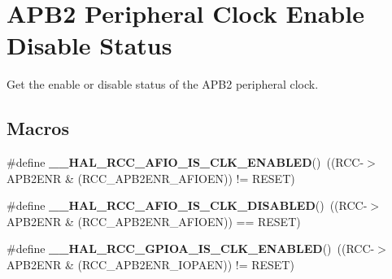 \hypertarget{group___r_c_c___a_p_b2___peripheral___clock___enable___disable___status}{}\section{A\+P\+B2 Peripheral Clock Enable Disable Status}
\label{group___r_c_c___a_p_b2___peripheral___clock___enable___disable___status}


Get the enable or disable status of the A\+P\+B2 peripheral clock.  


\subsection*{Macros}
\begin{DoxyCompactItemize}
\item 
\mbox{\label{group___r_c_c___a_p_b2___peripheral___clock___enable___disable___status_gaa1991a9155c5dcc5c006fa7077075ed1}} 
\#define {\bfseries \+\_\+\+\_\+\+H\+A\+L\+\_\+\+R\+C\+C\+\_\+\+A\+F\+I\+O\+\_\+\+I\+S\+\_\+\+C\+L\+K\+\_\+\+E\+N\+A\+B\+L\+ED}()~((R\+CC-\/$>$A\+P\+B2\+E\+NR \& (R\+C\+C\+\_\+\+A\+P\+B2\+E\+N\+R\+\_\+\+A\+F\+I\+O\+EN)) != R\+E\+S\+ET)
\item 
\mbox{\label{group___r_c_c___a_p_b2___peripheral___clock___enable___disable___status_ga2e3ea557d617246f51514913a6a273ff}} 
\#define {\bfseries \+\_\+\+\_\+\+H\+A\+L\+\_\+\+R\+C\+C\+\_\+\+A\+F\+I\+O\+\_\+\+I\+S\+\_\+\+C\+L\+K\+\_\+\+D\+I\+S\+A\+B\+L\+ED}()~((R\+CC-\/$>$A\+P\+B2\+E\+NR \& (R\+C\+C\+\_\+\+A\+P\+B2\+E\+N\+R\+\_\+\+A\+F\+I\+O\+EN)) == R\+E\+S\+ET)
\item 
\mbox{\label{group___r_c_c___a_p_b2___peripheral___clock___enable___disable___status_gad1edbd9407c814110f04c1a609a214e4}} 
\#define {\bfseries \+\_\+\+\_\+\+H\+A\+L\+\_\+\+R\+C\+C\+\_\+\+G\+P\+I\+O\+A\+\_\+\+I\+S\+\_\+\+C\+L\+K\+\_\+\+E\+N\+A\+B\+L\+ED}()~((R\+CC-\/$>$A\+P\+B2\+E\+NR \& (R\+C\+C\+\_\+\+A\+P\+B2\+E\+N\+R\+\_\+\+I\+O\+P\+A\+EN)) != R\+E\+S\+ET)
\item 
\mbox{\label{group___r_c_c___a_p_b2___peripheral___clock___enable___disable___status_ga2d73b007700fe1576c7965ce677148bd}} 

\end{DoxyCompactItemize}
